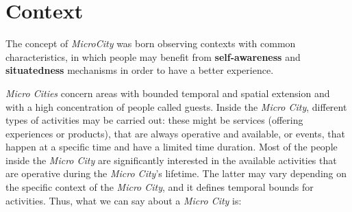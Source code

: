 \section{Context}\label{sec:context}

The concept of \textit{MicroCity} was born observing contexts with common characteristics, in which people may benefit from \textbf{self-awareness} and \textbf{situatedness} mechanisms in order to have a better experience.

\textit{Micro Cities} concern areas with bounded temporal and spatial extension and with a high concentration of people called guests.
Inside the \textit{Micro City}, different types of activities may be carried out: these might be services (offering experiences or products), that are always operative and available, or events, that happen at a specific time and have a limited time duration.
Most of the people inside the \textit{Micro City} are significantly interested in the available activities that are operative during the \textit{Micro City}'s lifetime.
The latter may vary depending on the specific context of the \textit{Micro City}, and it defines temporal bounds for activities.
Thus, what we can say about a \textit{Micro City} is:
